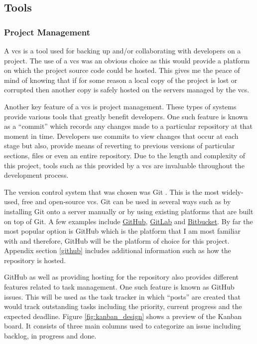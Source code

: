 \documentclass[11pt]{article}
\begin{document}
\subsection{Tools}
\subsubsection{Project Management} \label{project_management}
A \gls*{vcs} is a tool used for backing up and/or collaborating with developers
on a project. The use of a \gls*{vcs} was an obvious choice as this would provide
a platform on which the project source code could be hosted. This gives me the
peace of mind of knowing that if for some reason a local copy of the project is
lost or corrupted then another copy is safely hosted on the servers managed by
the \gls*{vcs}.

Another key feature of a \gls*{vcs} is project management. These types of systems
provide various tools that greatly benefit developers. One such feature is known
as a ``commit'' which records any changes made to a particular repository at
that moment in time. Developers use commits to view changes that occur at each
stage but also, provide means of reverting to previous versions of particular
sections, files or even an entire repository. Due to the length and complexity
of this project, tools such as this provided by a \gls*{vcs} are invaluable
throughout the development process.

The version control system that was chosen was Git \cite{gitvcs}. This is the
most widely-used, free and open-source \gls*{vcs}. Git can be used in several
ways such as by installing Git onto a server manually or by using existing
platforms that are built on top of Git. A few examples include
\href{http://github.com}{GitHub}, \href{http://gitlab.com}{GitLab} and
\href{https://bitbucket.org/}{Bitbucket}. By far the most popular option is
GitHub which is the platform that I am most familiar with and therefore, GitHub
will be the platform of choice for this project. Appendix section
\ref{github} includes additional information such as how the
repository is hosted.

GitHub as well as providing hosting for the repository also provides different
features related to task management. One such feature is known as GitHub issues.
This will be used as the task tracker in which ``posts'' are created that would
track outstanding tasks including the priority, current progress and the
expected deadline. Figure \ref{fig:kanban_design} shows a preview of the Kanban
board. It consists of three main columns used to categorize an issue including
backlog, in progress and done. 
\end{document}
